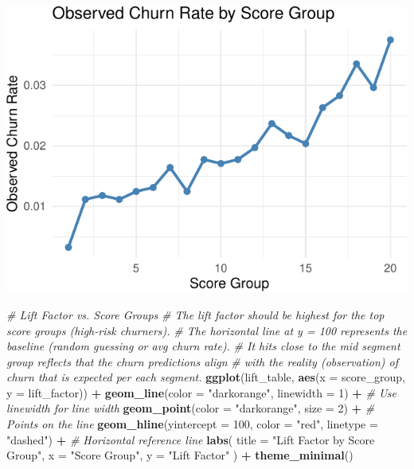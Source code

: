 \documentclass[
]{article}
\newenvironment{Shaded}{\begin{snugshade}}{\end{snugshade}}
\newcommand{\AttributeTok}[1]{\textcolor[rgb]{0.13,0.29,0.53}{#1}}
\newcommand{\CommentTok}[1]{\textcolor[rgb]{0.56,0.35,0.01}{\textit{#1}}}
\newcommand{\DecValTok}[1]{\textcolor[rgb]{0.00,0.00,0.81}{#1}}
\newcommand{\FunctionTok}[1]{\textcolor[rgb]{0.13,0.29,0.53}{\textbf{#1}}}
\newcommand{\NormalTok}[1]{#1}
\newcommand{\SpecialCharTok}[1]{\textcolor[rgb]{0.81,0.36,0.00}{\textbf{#1}}}
\newcommand{\StringTok}[1]{\textcolor[rgb]{0.31,0.60,0.02}{#1}}
\begin{document}
\begin{flushright}\includegraphics{p5-6_files/figure-latex/unnamed-chunk-14-1} \end{flushright}

\begin{Shaded}
\begin{Highlighting}[]
\CommentTok{\# Lift Factor vs. Score Groups}
\CommentTok{\# The lift factor should be highest for the top score groups (high{-}risk churners).}
\CommentTok{\# The horizontal line at y = 100 represents the baseline (random guessing or avg churn rate). }
\CommentTok{\# It hits close to the mid segment group reflects that the churn predictions align }
\CommentTok{\# with the reality (observation) of churn that is expected per each segment.}
\FunctionTok{ggplot}\NormalTok{(lift\_table, }\FunctionTok{aes}\NormalTok{(}\AttributeTok{x =}\NormalTok{ score\_group, }\AttributeTok{y =}\NormalTok{ lift\_factor)) }\SpecialCharTok{+}
  \FunctionTok{geom\_line}\NormalTok{(}\AttributeTok{color =} \StringTok{"darkorange"}\NormalTok{, }\AttributeTok{linewidth =} \DecValTok{1}\NormalTok{) }\SpecialCharTok{+}  \CommentTok{\# Use \textasciigrave{}linewidth\textasciigrave{} for line width}
  \FunctionTok{geom\_point}\NormalTok{(}\AttributeTok{color =} \StringTok{"darkorange"}\NormalTok{, }\AttributeTok{size =} \DecValTok{2}\NormalTok{) }\SpecialCharTok{+}  \CommentTok{\# Points on the line}
  \FunctionTok{geom\_hline}\NormalTok{(}\AttributeTok{yintercept =} \DecValTok{100}\NormalTok{, }\AttributeTok{color =} \StringTok{"red"}\NormalTok{, }\AttributeTok{linetype =} \StringTok{"dashed"}\NormalTok{) }\SpecialCharTok{+}  \CommentTok{\# Horizontal reference line}
  \FunctionTok{labs}\NormalTok{(}
    \AttributeTok{title =} \StringTok{"Lift Factor by Score Group"}\NormalTok{,}
    \AttributeTok{x =} \StringTok{"Score Group"}\NormalTok{,}
    \AttributeTok{y =} \StringTok{"Lift Factor"}
\NormalTok{  ) }\SpecialCharTok{+}
  \FunctionTok{theme\_minimal}\NormalTok{()}
\end{Highlighting}
\end{Shaded}
\end{document}
